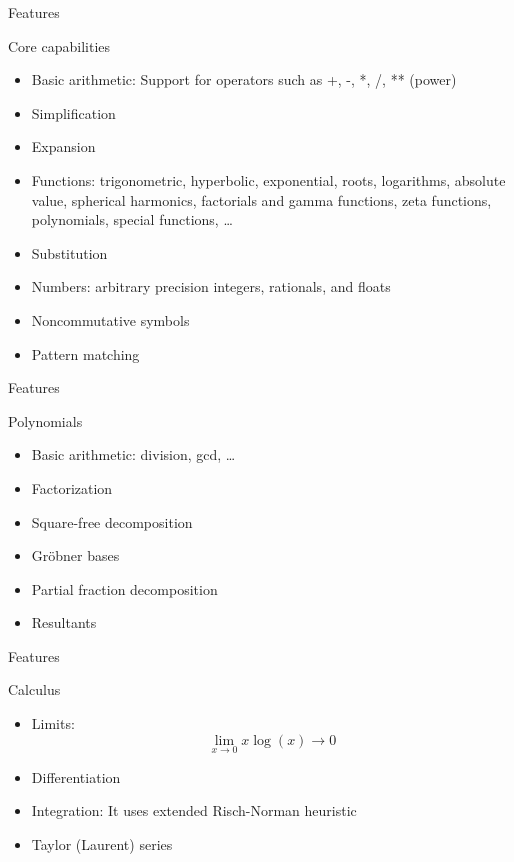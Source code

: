 \documentclass[xcolor=svgnames]{beamer}
\begin{document}
\begin{frame}{Features}
  \begin{block}{Core capabilities}
    \begin{itemize}
    \item Basic arithmetic: Support for operators such as +, -, *, /, ** (power)
    \item Simplification
    \item Expansion
    \item Functions: trigonometric, hyperbolic, exponential, roots, logarithms,
      absolute value, spherical harmonics, factorials and gamma functions, zeta
      functions, polynomials, special functions, \ldots
    \item Substitution
    \item Numbers: arbitrary precision integers, rationals, and floats
    \item Noncommutative symbols
    \item Pattern matching
    \end{itemize}
  \end{block}
\end{frame}

\begin{frame}{Features}
  \begin{block}{Polynomials}
    \begin{itemize}
    \item Basic arithmetic: division, gcd, \ldots
    \item Factorization
    \item Square-free decomposition
    \item Gröbner bases
    \item Partial fraction decomposition
    \item Resultants
    \end{itemize}
  \end{block}
\end{frame}

\begin{frame}{Features}
  \begin{block}{Calculus}
    \begin{itemize}
    \item Limits: $$\lim_{x\to 0}{x\log(x)} \rightarrow 0$$
    \item Differentiation
    \item Integration: It uses extended Risch-Norman heuristic
    \item Taylor (Laurent) series
    \end{itemize}
  \end{block}
\end{frame}
\end{document}
